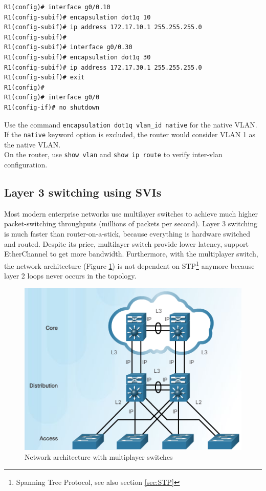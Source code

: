 \begin{verbatim}
R1(config)# interface g0/0.10
R1(config-subif)# encapsulation dot1q 10
R1(config-subif)# ip address 172.17.10.1 255.255.255.0
R1(config-subif)# 
R1(config-subif)# interface g0/0.30
R1(config-subif)# encapsulation dot1q 30
R1(config-subif)# ip address 172.17.30.1 255.255.255.0
R1(config-subif)# exit
R1(config)# 
R1(config)# interface g0/0
R1(config-if)# no shutdown
\end{verbatim}

\note Use the command \verb|encapsulation dot1q vlan_id native| for the native VLAN. If the \verb|native| keyword option is excluded, the router would consider VLAN 1 as the native VLAN.\\

On the router, use \verb|show vlan| and \verb|show ip route| to verify inter-vlan configuration.

\subsection{Layer 3 switching using SVIs}

Most modern enterprise networks use multilayer switches to achieve much higher packet-switching throughputs (millions of packets per second). Layer 3 switching is much faster than router-on-a-stick, because everything is hardware switched and routed. Despite its price, multilayer switch provide lower latency, support EtherChannel to get more bandwidth. Furthermore, with the multiplayer switch, the network architecture (Figure \ref{NetArch}) is not dependent on STP\footnote{Spanning Tree Protocol, see also section \ref{sec:STP} } anymore because layer 2 loops never occurs in the topology.

\begin{figure}[hbtp]
\caption{Network architecture with multiplayer switches}\label{NetArch}
\centering
\includegraphics[scale=0.6]{pictures/NetArch.PNG}
\end{figure}


